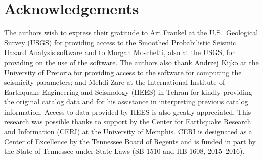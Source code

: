 \section{Acknowledgements}

The authors wish to express their gratitude to Art Fran\-kel at the U.S.~Geological Survey (USGS) for providing access to the Smoothed Probabilistic Seismic Hazard Analysis software and to Morgan Moschetti, also at the USGS, for providing  on the use of the software. The authors also thank Andrzej Kijko at the University of Pretoria for providing access to the software for computing the seismicity parameters; and Mehdi Zare at the International Institute of Earthquake Engineering and Seismology (IIEES) in Tehran for kindly providing the original catalog data and for his assistance in interpreting previous catalog information. Access to data provided by IIEES is also greatly appreciated. This research was possible thanks to support by the Center for Earthquake Research and Information (CERI) at the University of Memphis. CERI is designated as a Center of Excellence by the Tennessee Board of Regents and is funded in part by the State of Tennessee under State  Laws (SB 1510 and HB 1608, 2015--2016).
 